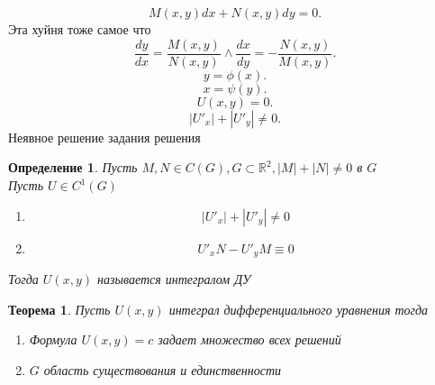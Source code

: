 \documentclass[14pt]{extarticle}
\newtheorem{theorem}{Теорема}
\newtheorem{definition}{Определение}
\begin{document}
\section{}
\[
	M(x,y) dx + N(x,y) dy = 0
	.\]
Эта хуйня тоже самое что
\[
	\frac{dy}{dx} = \frac{M(x,y)}{N(x,y)} \land \frac{dx}{dy} = - \frac{N(x,y)}{M(x,y)}
	.\]
\[
	y = \phi(x)
	.\]
\[
	x = \psi(y)
	.\]
\[
	U(x,y) = 0
	.\]
\[
	|U'_{x}| + |U'_{y}|  \neq 0
	.\]
Неявное решение задания решения
\begin{definition}
	Пусть $M,N \in C(G), G \subset \mathbb{R}^2, |M|+|N| \neq 0$ в $G$ \\
	Пусть $U \in C^{1}(G)$
	\begin{enumerate}
		\item
		      \begin{equation}
			      |U'_{x} | + |U'_{y} | \neq 0
		      \end{equation}
		\item
		      \begin{equation}
			      U'_{x} N - U'_{y} M \equiv 0
		      \end{equation}
	\end{enumerate}
	Тогда $U(x,y)$ называется интегралом ДУ
\end{definition}
\begin{theorem}
	Пусть $U(x,y)$ интеграл дифференциального уравнения тогда
	\begin{enumerate}
		\item Формула $U(x,y) = c$\label{6} задает множество всех решений
		\item  $G$ область существования и единственности
	\end{enumerate}
\end{theorem}
\end{document}
